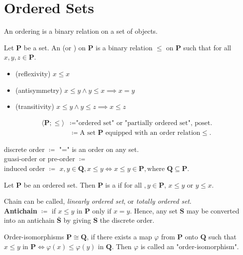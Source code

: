 \section{Ordered Sets}

An ordering is a binary relation on a set of objects. 

\begin{definition}
    Let $\bm{P}$ be a set. An  (or ) on $\bm{P}$ is a binary relation $\leq$ on $\bm{P}$ 
    such that for all $x, y, z \in \bm{P}$.
    \begin{itemize}
        \item (reflexivity) $x \leq x$
        \item (antisymmetry) $x \leq y \land y \leq x \implies x = y$
        \item (transitivity) $x \leq y \land y \leq z \implies x \leq z$
    \end{itemize}
\end{definition}

\begin{align*}
    \langle \bm{P}; \leq \rangle &\coloneqq \text{"ordered set" or "partially ordered set", poset.}\\
                            &\coloneqq \text{A set } \bm{P} \text{ equipped with an order relation} \leq. 
\end{align*}

discrete order $\coloneqq$ "=" is an order on any set.\\
guasi-order or pre-order $\coloneqq$  \\
induced order $\coloneqq$ $x, y \in \bm{Q}, x \leq y \iff x \leq y \in \bm{P}, \text{where } \bm{Q} \subseteq \bm{P}.$\\

\begin{definition}
    Let $\bm{P}$ be an ordered set. Then $\bm{P}$ is a  if for all $, y \in \bm{P}$,  $x \leq y \text{ or } y \leq x$.
\end{definition}
Chain can be called, \textit{linearly ordered set}, or \textit{totally ordered set}.\\
\textbf{Antichain} $\coloneqq$ if $x \leq y \text{ in } \bm{P} \text{ only if } x = y$.
Hence, any set $\bm{S}$ may be converted into an antichain $\bar{\bm{S}}$ by giving $\bm{S}$ the discrete order.

\begin{definition}{Order-isomorphisms}
    $\bm{P} \cong \bm{Q}$, if there exists a map $\varphi$ from $\bm{P}$ onto $\bm{Q}$ such that $x \leq y$ in $\bm{P} \iff \varphi(x) \leq \varphi(y)$ in $\bm{Q}$.
    Then $\varphi$ is called an "order-isomorphism".
\end{definition}

